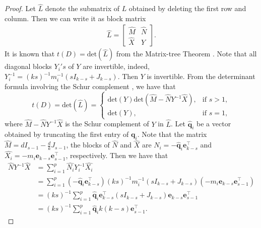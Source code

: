\documentclass{article}
\begin{document}
\begin{proof}
Let $\widehat{L}$ denote the submatrix of $L$ obtained by deleting the first row and column.
Then we can write it as block matrix
\begin{align*}
\widehat{L}=\begin{bmatrix} \widehat{M} & \widehat{N} \\ \widehat{X} & Y \end{bmatrix}.
\end{align*}
It is known that $t(D)=\mathrm{det}(\widehat{L})$ from the Matrix-tree Theorem \cite{duval2009simplicial}.
Note that all diagonal blocks $Y_{i}'s$ of $Y$ are invertible,
indeed, $Y_{i}^{-1}=(ks)^{-1}m_{i}^{-1}(sI_{k-s}+J_{k-s})$.
Then $Y$ is invertible.
From the determinant formula involving the Schur complement \cite{brualdi1983determinantal},
we have that
\begin{equation}\label{eq3}
t(D)=\mathrm{det}(\widehat{L})=\begin{cases}
\mathrm{det}(Y)\mathrm{det}(\widehat{M}-\widehat{N}Y^{-1}\widehat{X}), &\text{if $s>1$},\\
\mathrm{det}(Y), &\text{if $s=1$},
\end{cases}
\end{equation}
where $\widehat{M}-\widehat{N}Y^{-1}\widehat{X}$ is the Schur complement of $Y$ in $\widehat{L}$.
Let $\hat{\mathbf{q}}_{i}$ be a vector obtained by truncating the first entry of $\mathbf{q}_{i}$.
Note that the matrix $\widehat{M}=dI_{s-1}-\frac{d}{k}J_{s-1}$,
the blocks of $\widehat{N}$ and $\widehat{X}$ are $\widehat{N_{i}}=-\hat{\mathbf{q}}_{i}\mathbf{e}_{k-s}^{\top}$ and $\widehat{X_{i}}=-m_{i}\mathbf{e}_{k-s}\mathbf{e}_{s-1}^{\top}$, respectively.
Then we have that
\begin{align*}
\widehat{N}Y^{-1}\widehat{X}&=\sum_{i=1}^{p}\widehat{N_{i}}Y_{i}^{-1}\widehat{X_{i}}\\
&=\sum_{i=1}^{p}\left(-\hat{\mathbf{q}}_{i}\mathbf{e}_{k-s}^{\top}\right)(ks)^{-1}m_{i}^{-1}(sI_{k-s}+J_{k-s})\left(-m_{i}\mathbf{e}_{k-s}\mathbf{e}_{s-1}^{\top}\right)\\
&=(ks)^{-1}\sum_{i=1}^{p}\hat{\mathbf{q}}_{i}\mathbf{e}_{k-s}^{\top}(sI_{k-s}+J_{k-s})\mathbf{e}_{k-s}\mathbf{e}_{s-1}^{\top}\\
&=(ks)^{-1}\sum_{i=1}^{p}\hat{\mathbf{q}}_{i}k(k-s)\mathbf{e}_{s-1}^{\top}.
\end{align*}


\end{proof}
\end{document}

